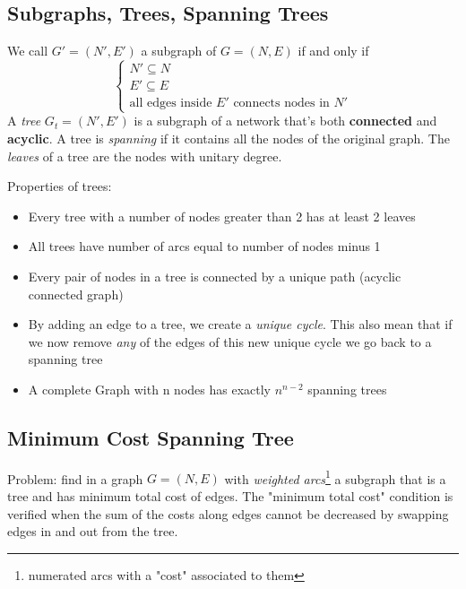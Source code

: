 \documentclass{article}
\begin{document}
		\subsection{Subgraphs, Trees, Spanning Trees}
			We call $G' = (N', E')$ a subgraph of $G = (N, E)$ if and only if
			\begin{equation}
				\begin{cases}
					N' \subseteq N \\
					E' \subseteq E \\
					\text{all edges inside $E'$ connects nodes in $N'$}
				\end{cases}
			\end{equation}
			A \textit{tree} $G_t = (N', E')$ is a subgraph of a network that's both \textbf{connected} and \textbf{acyclic}. A tree is \textit{spanning} if it contains all the nodes of the original graph. The \textit{leaves} of a tree are the nodes with unitary degree.

			Properties of trees:
			\begin{itemize}
				\item Every tree with a number of nodes greater than 2 has at least 2 leaves
				\item All trees have number of arcs equal to number of nodes minus 1
				\item Every pair of nodes in a tree is connected by a unique path (acyclic connected graph)
				\item By adding an edge to a tree, we create a \textit{unique cycle}. This also mean that if we now remove \textit{any} of the edges of this new unique cycle we go back to a spanning tree
				\item A complete Graph with n nodes has exactly $n^{n-2}$ spanning trees
			\end{itemize}

		\subsection{Minimum Cost Spanning Tree}
			Problem: find in a graph $G = (N, E)$ with \textit{weighted arcs}\footnote{numerated arcs with a "cost" associated to them} a subgraph that is a tree and has minimum total cost of edges. The "minimum total cost" condition is verified when the sum of the costs along edges cannot be decreased by swapping edges in and out from the tree.
\end{document}
